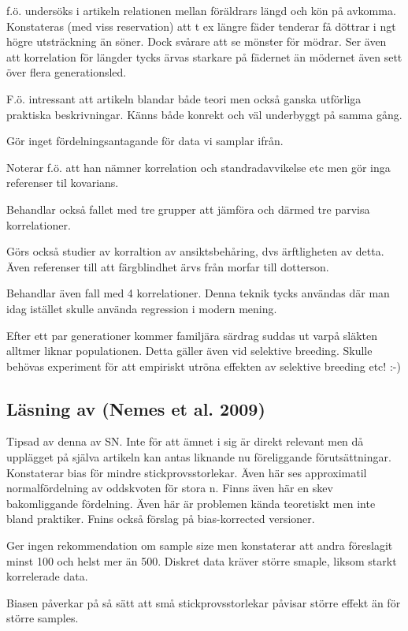 \documentclass[]{article}
\begin{document}
f.ö. undersöks i artikeln relationen mellan föräldrars längd och kön på
avkomma. Konstateras (med viss reservation) att t ex längre fäder
tenderar få döttrar i ngt högre utsträckning än söner. Dock svårare att
se mönster för mödrar. Ser även att korrelation för längder tycks ärvas
starkare på fädernet än mödernet även sett över flera generationsled.

F.ö. intressant att artikeln blandar både teori men också ganska
utförliga praktiska beskrivningar. Känns både konrekt och väl underbyggt
på samma gång.

Gör inget fördelningsantagande för data vi samplar ifrån.

Noterar f.ö. att han nämner korrelation och standradavvikelse etc men
gör inga referenser til kovarians.

Behandlar också fallet med tre grupper att jämföra och därmed tre
parvisa korrelationer.

Görs också studier av korraltion av ansiktsbehåring, dvs ärftligheten av
detta. Även referenser till att färgblindhet ärvs från morfar till
dotterson.

Behandlar även fall med 4 korrelationer. Denna teknik tycks användas där
man idag istället skulle använda regression i modern mening.

Efter ett par generationer kommer familjära särdrag suddas ut varpå
släkten alltmer liknar populationen. Detta gäller även vid selektive
breeding. Skulle behövas experiment för att empiriskt utröna effekten av
selektive breeding etc! :-)

\subsection{Läsning av (Nemes et al. 2009)}\label{lasning-av-nemes2009}

Tipsad av denna av SN. Inte för att ämnet i sig är direkt relevant men
då upplägget på själva artikeln kan antas liknande nu föreliggande
förutsättningar. Konstaterar bias för mindre stickprovsstorlekar. Även
här ses approximatil normalfördelning av oddskvoten för stora n. Finns
även här en skev bakomliggande fördelning. Även här är problemen kända
teoretiskt men inte bland praktiker. Fnins också förslag på
bias-korrected versioner.

Ger ingen rekommendation om sample size men konstaterar att andra
föreslagit minst 100 och helst mer än 500. Diskret data kräver större
smaple, liksom starkt korrelerade data.

Biasen påverkar på så sätt att små stickprovsstorlekar påvisar större
effekt än för större samples.
\end{document}
